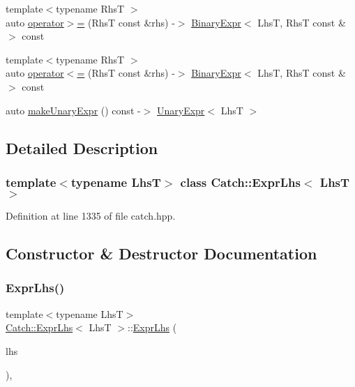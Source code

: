 \begin{DoxyCompactItemize}
\item 
{\footnotesize template$<$typename RhsT $>$ }\\auto \mbox{\hyperlink{class_catch_1_1_expr_lhs_aff594ae5b957105c517a6257d2e730f0}{operator$>$=}} (RhsT const \&rhs) -\/$>$ \mbox{\hyperlink{class_catch_1_1_binary_expr}{Binary\+Expr}}$<$ LhsT, RhsT const \&$>$ const
\item 
{\footnotesize template$<$typename RhsT $>$ }\\auto \mbox{\hyperlink{class_catch_1_1_expr_lhs_a6bd8a22c1a7fe2f66d71d7196f20af4f}{operator$<$=}} (RhsT const \&rhs) -\/$>$ \mbox{\hyperlink{class_catch_1_1_binary_expr}{Binary\+Expr}}$<$ LhsT, RhsT const \&$>$ const
\item 
auto \mbox{\hyperlink{class_catch_1_1_expr_lhs_ab68bd6d5d3ae21b7fba9010150fba95d}{make\+Unary\+Expr}} () const -\/$>$ \mbox{\hyperlink{class_catch_1_1_unary_expr}{Unary\+Expr}}$<$ LhsT $>$
\end{DoxyCompactItemize}


\subsection{Detailed Description}
\subsubsection*{template$<$typename LhsT$>$\newline
class Catch\+::\+Expr\+Lhs$<$ Lhs\+T $>$}



Definition at line 1335 of file catch.\+hpp.



\subsection{Constructor \& Destructor Documentation}
\mbox{\label{class_catch_1_1_expr_lhs_ad22c6af1a7d6993240624d299714a479}} 
\subsubsection{\texorpdfstring{Expr\+Lhs()}{ExprLhs()}}
{\footnotesize\ttfamily template$<$typename LhsT$>$ \\
\mbox{\hyperlink{class_catch_1_1_expr_lhs}{Catch\+::\+Expr\+Lhs}}$<$ LhsT $>$\+::\mbox{\hyperlink{class_catch_1_1_expr_lhs}{Expr\+Lhs}} (\begin{DoxyParamCaption}\item[{LhsT}]{lhs }\end{DoxyParamCaption})\hspace{0.3cm}{\ttfamily [inline]}, {\ttfamily [explicit]}}



